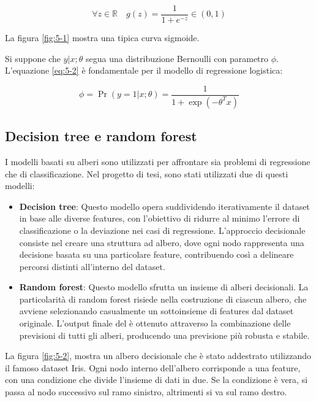 \begin{equation}
    \boxed{
        \forall z \in \mathbb{R} \quad g(z) = \frac{1}{1 + e^{-z}} \in (0, 1)
    }
    \label{eq:5-1}
\end{equation}

\bigskip

La figura \ref{fig:5-1} mostra una tipica curva sigmoide.

\bigskip

Si suppone che \( y | x; \theta \) segua una distribuzione Bernoulli con parametro \( \phi \). L'equazione \ref{eq:5-2} è fondamentale per il modello di regressione logistica:

\begin{equation}
    \boxed{
        \phi = \Pr(y = 1 | x; \theta) = \frac{1}{1 + \exp{(-\theta^T x)}}
    }
    \label{eq:5-2}
\end{equation}

\subsection{Decision tree e random forest}

I modelli basati su alberi sono utilizzati per affrontare sia problemi di regressione che di classificazione. Nel progetto di tesi, sono stati utilizzati due di questi modelli:

\begin{itemize}
    \item \textbf{Decision tree}: Questo modello opera suddividendo iterativamente il dataset in base alle diverse features, con l'obiettivo di ridurre al minimo l'errore di classificazione o la deviazione nei casi di regressione. L'approccio decisionale consiste nel creare una struttura ad albero, dove ogni nodo rappresenta una decisione basata su una particolare feature, contribuendo così a delineare percorsi distinti all'interno del dataset.
    \item \textbf{Random forest}: Questo modello sfrutta un insieme di alberi decisionali. La particolarità di random forest risiede nella costruzione di ciascun albero, che avviene selezionando casualmente un sottoinsieme di features dal dataset originale. L'output finale del è ottenuto attraverso la combinazione delle previsioni di tutti gli alberi, producendo una previsione più robusta e stabile.
\end{itemize}

\bigskip

La figura \ref{fig:5-2}, mostra un albero decisionale che è stato addestrato utilizzando il famoso dataset Iris. Ogni nodo interno dell'albero corrisponde a una feature, con una condizione che divide l'insieme di dati in due. Se la condizione è vera, si passa al nodo successivo sul ramo sinistro, altrimenti si va sul ramo destro.

